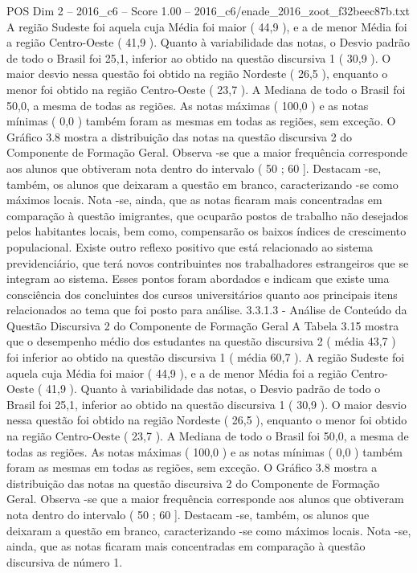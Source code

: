 \begin{textsample}{POS Dim 2 – 2016\_c6 – Score 1.00 – 2016\_c6/enade\_2016\_zoot\_f32beec87b.txt}
A região Sudeste foi aquela cuja Média foi maior ( 44,9 ), e a de menor Média foi a região Centro-Oeste ( 41,9 ).
Quanto à variabilidade das notas, o Desvio padrão de todo o Brasil foi 25,1, inferior ao obtido na questão discursiva 1 ( 30,9 ).
O maior desvio nessa questão foi obtido na região Nordeste ( 26,5 ), enquanto o menor foi obtido na região Centro-Oeste ( 23,7 ).
A Mediana de todo o Brasil foi 50,0, a mesma de todas as regiões.
As notas máximas ( 100,0 ) e as notas mínimas ( 0,0 ) também foram as mesmas em todas as regiões, sem exceção.
O Gráfico 3.8 mostra a distribuição das notas na questão discursiva 2 do Componente de Formação Geral.
Observa -se que a maior frequência corresponde aos alunos que obtiveram nota dentro do intervalo ( 50 ; 60 ].
Destacam -se, também, os alunos que deixaram a questão em branco, caracterizando -se como máximos locais.
Nota -se, ainda, que as notas ficaram mais concentradas em comparação à questão imigrantes, que ocuparão postos de trabalho não desejados pelos habitantes locais, bem como, compensarão os baixos índices de crescimento populacional.
Existe outro reflexo positivo que está relacionado ao sistema previdenciário, que terá novos contribuintes nos trabalhadores estrangeiros que se integram ao sistema.
Esses pontos foram abordados e indicam que existe uma consciência dos concluintes dos cursos universitários quanto aos principais itens relacionados ao tema que foi posto para análise. 3.3.1.3 - Análise de Conteúdo da Questão Discursiva 2 do Componente de Formação Geral A Tabela 3.15 mostra que o desempenho médio dos estudantes na questão discursiva 2 ( média 43,7 ) foi inferior ao obtido na questão discursiva 1 ( média 60,7 ).
A região Sudeste foi aquela cuja Média foi maior ( 44,9 ), e a de menor Média foi a região Centro-Oeste ( 41,9 ).
Quanto à variabilidade das notas, o Desvio padrão de todo o Brasil foi 25,1, inferior ao obtido na questão discursiva 1 ( 30,9 ).
O maior desvio nessa questão foi obtido na região Nordeste ( 26,5 ), enquanto o menor foi obtido na região Centro-Oeste ( 23,7 ).
A Mediana de todo o Brasil foi 50,0, a mesma de todas as regiões.
As notas máximas ( 100,0 ) e as notas mínimas ( 0,0 ) também foram as mesmas em todas as regiões, sem exceção.
O Gráfico 3.8 mostra a distribuição das notas na questão discursiva 2 do Componente de Formação Geral.
Observa -se que a maior frequência corresponde aos alunos que obtiveram nota dentro do intervalo ( 50 ; 60 ].
Destacam -se, também, os alunos que deixaram a questão em branco, caracterizando -se como máximos locais.
Nota -se, ainda, que as notas ficaram mais concentradas em comparação à questão discursiva de número 1.

\end{textsample}
